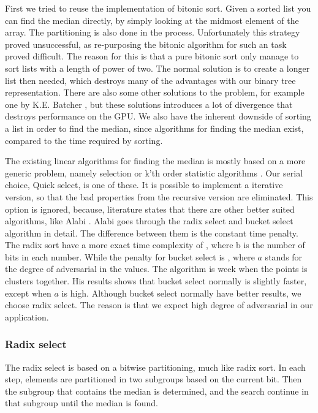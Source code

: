 First we tried to reuse the implementation of bitonic sort. Given a sorted list you can find the median directly, by simply looking at the midmost element of the array. The partitioning is also done in the process. Unfortunately this strategy proved unsuccessful, as re-purposing the bitonic algorithm for such an task proved difficult. The reason for this is that a pure bitonic sort only manage to sort lists with a length of power of two. The normal solution is to create a longer list then needed, which destroys many of the advantages with our binary tree representation. There are also some other solutions to the problem, for example one by K.E. Batcher \cite{Batcher:1968}, but these solutions introduces a lot of divergence that destroys performance on the GPU. We also have the inherent downside of sorting a list in order to find the median, since  algorithms for finding the median exist, compared to the  time required by sorting.


The existing linear algorithms for finding the median is mostly based on a more generic problem, namely selection or k'th order statistic algorithms \citep{Cormen:2001}. Our serial choice, Quick select, is one of these. It is possible to implement a iterative version, so that the bad properties from the recursive version are eliminated. This option is ignored, because, literature states that there are other better suited algorithms, like Alabi \citep{Alabi:2012}. Alabi goes through the radix select and bucket select algorithm in detail. The difference between them is the constant time penalty. The radix sort have a more exact time complexity of , where b is the number of bits in each number. While the penalty for bucket select is , where $a$ stands for the degree of adversarial in the values. The algorithm is week when the points is clusters together. His results shows that bucket select normally is slightly faster, except when $a$ is high. Although bucket select normally have better results, we choose radix select. The reason is that we expect high degree of adversarial in our application.


\subsubsection{Radix select} %
\label{ssub:radix_select}


The radix select is based on a bitwise partitioning, much like radix sort. In each step, elements are partitioned in two subgroups based on the current bit. Then the subgroup that contains the median is determined, and the search continue in that subgroup until the median is found.

